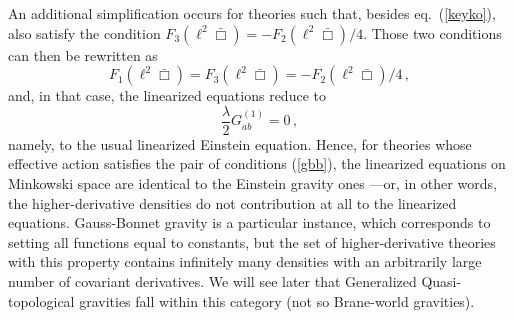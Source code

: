 \documentclass[11pt]{article}
\newcommand{\req}[1]{(\ref{#1})} %
\newcommand{\bea}{\begin{eqnarray}}
\newcommand{\eea}{\end{eqnarray}}
\renewcommand{\req}[1]{eq.~(\ref{#1})}
\newcommand{\comment}[1]{{\bf [[[#1]]]}}
\begin{document}
An additional simplification occurs for theories such that, besides \req{keyko}, also satisfy the condition $F_3(\ell^2 \bar\Box)=-F_2(\ell^2 \bar\Box)/4$. Those two conditions can then be rewritten as 
\begin{equation}\label{gbb}
F_1(\ell^2 \bar\Box)=F_3(\ell^2 \bar\Box)=-F_2(\ell^2 \bar\Box)/4 \, ,
\end{equation}
and, in that case, the linearized equations reduce to
\begin{equation}
\frac{\lambda}{2} G_{ab}^{(1)}=0\, ,
\end{equation}
namely, to the usual linearized Einstein equation.
Hence, for theories whose effective action satisfies the pair of conditions (\ref{gbb}), the linearized equations on Minkowski space are identical to the Einstein gravity ones ---or, in other words, the higher-derivative densities do not contribution at all to the linearized equations. Gauss-Bonnet gravity is a particular instance, which corresponds to setting all functions equal to constants, but the set of higher-derivative theories with this property contains infinitely many densities with an arbitrarily large number of covariant derivatives. We will see later that Generalized Quasi-topological gravities fall within this category (not so Brane-world gravities). 
\end{document}
